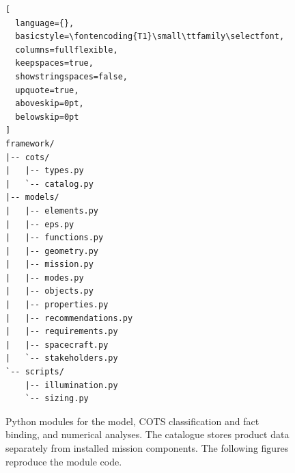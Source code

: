 \begin{figure}[htbp]
\centering
\begin{minipage}{0.65\linewidth}
\begin{lstlisting}[
  language={},
  basicstyle=\fontencoding{T1}\small\ttfamily\selectfont,
  columns=fullflexible,
  keepspaces=true,
  showstringspaces=false,
  upquote=true,
  aboveskip=0pt,
  belowskip=0pt
]
framework/
|-- cots/
|   |-- types.py
|   `-- catalog.py
|-- models/
|   |-- elements.py
|   |-- eps.py
|   |-- functions.py
|   |-- geometry.py
|   |-- mission.py
|   |-- modes.py
|   |-- objects.py
|   |-- properties.py
|   |-- recommendations.py
|   |-- requirements.py
|   |-- spacecraft.py
|   `-- stakeholders.py
`-- scripts/
    |-- illumination.py
    `-- sizing.py
\end{lstlisting}
\end{minipage}
\caption[Model, catalogue and analysis modules.]{Python modules for the model, COTS classification and fact binding, and numerical analyses. The catalogue stores product data separately from installed mission components. The following figures reproduce the module code.}
\label{fig:framework-code-structure}
\end{figure}
